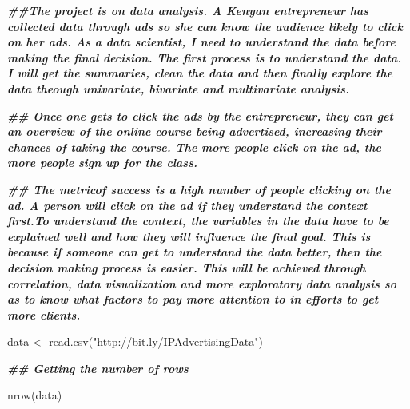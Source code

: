 \documentclass[
]{article}
\newenvironment{Shaded}{\begin{snugshade}}{\end{snugshade}}
\newcommand{\DocumentationTok}[1]{\textcolor[rgb]{0.56,0.35,0.01}{\textbf{\textit{#1}}}}
\newcommand{\FunctionTok}[1]{\textcolor[rgb]{0.00,0.00,0.00}{#1}}
\newcommand{\NormalTok}[1]{#1}
\newcommand{\OtherTok}[1]{\textcolor[rgb]{0.56,0.35,0.01}{#1}}
\newcommand{\StringTok}[1]{\textcolor[rgb]{0.31,0.60,0.02}{#1}}
\begin{document}
\begin{Shaded}
\begin{Highlighting}[]
\DocumentationTok{\#\#The project is on data analysis. A Kenyan entrepreneur has collected data through ads so she can know the audience likely to click on her ads. As a data scientist, I need to understand the data before making the final decision. The first process is to understand the data. I will get the summaries, clean the data and then finally explore the data theough univariate, bivariate and multivariate analysis.}

\DocumentationTok{\#\# Once one gets to click the ads by the entrepreneur, they can get an overview of the online course being advertised, increasing their chances of taking the course. The more people click on the ad, the more people sign up for the class.}


\DocumentationTok{\#\# The metricof success is a high number of people clicking on the ad. A person will click on the ad if they understand the context first.To understand the context, the variables in the data have to be explained well and how they will influence the final goal. This is because if someone can get to understand the data better, then the decision making process is easier. This will be achieved through correlation, data visualization and more exploratory data analysis so as to know what factors to pay more attention to in efforts to get more clients.}
\end{Highlighting}
\end{Shaded}

\begin{Shaded}
\begin{Highlighting}[]
\NormalTok{data }\OtherTok{\textless{}{-}} \FunctionTok{read.csv}\NormalTok{(}\StringTok{"http://bit.ly/IPAdvertisingData"}\NormalTok{)}
\end{Highlighting}
\end{Shaded}

\begin{Shaded}
\begin{Highlighting}[]
\DocumentationTok{\#\# Getting the number of rows}
\end{Highlighting}
\end{Shaded}

\begin{Shaded}
\begin{Highlighting}[]
\FunctionTok{nrow}\NormalTok{(data)}
\end{Highlighting}
\end{Shaded}
\end{document}
